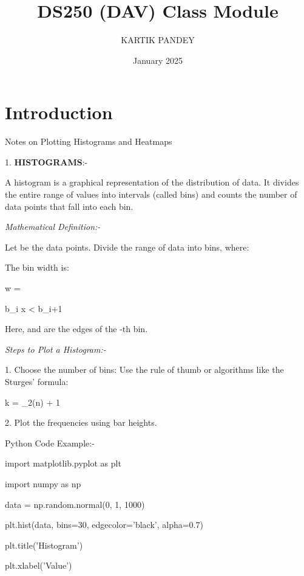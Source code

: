 \documentclass{report}
\title{DS250 (DAV) Class Module}
\author{KARTIK PANDEY}
\date{January 2025}
\begin{document}
\maketitle

\section{Introduction}

 Notes on Plotting Histograms and Heatmaps 
 \setlength{\parskip}{1em}

 

1. \textbf{HISTOGRAMS}:-


\setlength{\parskip}{1em}


 
A histogram is a graphical representation of the distribution of data. It divides the entire range of values into intervals (called bins) and counts the number of data points that fall into each bin.


\textit\setlength{\parindent}{} 
\textit{{Mathematical Definition}:-} 


Let  be the data points. Divide the range of data into  bins, where:

The bin width  is:

w = 

b_i \leq x < b_{i+1} 

Here,  and  are the edges of the -th bin.


\textit{Steps to Plot a Histogram:-}


1. Choose the number of bins: Use the rule of thumb or algorithms like the Sturges' formula:



k = \lceil \log_2(n) + 1 \rceil

2. Plot the frequencies using bar heights.


\setlength{\parskip}{1em}


Python Code Example:-


import matplotlib.pyplot as plt

import numpy as np



data = np.random.normal(0, 1, 1000)


plt.hist(data, bins=30, edgecolor='black', alpha=0.7)

plt.title('Histogram')

plt.xlabel('Value')
\end{document}
